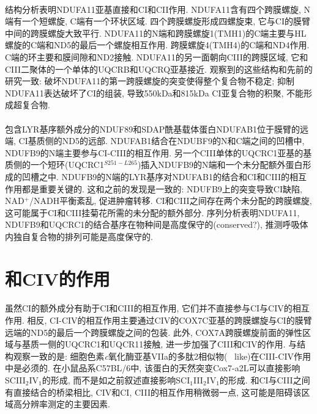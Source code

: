 \documentclass{article}
\begin{document}
  \paragraph{}
    结构分析表明NDUFA11亚基直接和CI和CII作用. NDUFA11含有四个跨膜螺旋, N端有一个短螺旋, C端有一个环状区域. 四个跨膜螺旋形成四螺旋束, 它与CI的膜臂中间的跨膜螺旋大致平行. NDUFA11的N端和跨膜螺旋1(TMH1)的C端主要与HL螺旋的C端和ND5的最后一个螺旋相互作用. 跨膜螺旋4(TMH4)的C端和ND4作用. C端的环主要和膜间隙和ND2接触. NDUFA11的另一面朝向CIII的跨膜区域, 它和CIII二聚体的一个单体的UQCRB和UQCRQ亚基接近. 观察到的这些结构和先前的研究一致: 破坏NDUFA11的第一跨膜螺旋的突变使得整个复合物不稳定; 抑制NDUFA11表达破坏了CI的组装, 导致550kDa和815kDa CI亚复合物的积聚, 不能形成超复合物.
  \paragraph{}
    包含LYR基序额外成分的NDUF89和SDAP酰基载体蛋白NDUFAB1位于膜臂的远端, CI基质侧的ND5的远部. NDUFAB1结合在NDUBF9的N和C端之间的凹槽中, NDUFB9的N端主要参与CI-CIII的相互作用. 另一个CIII单体的UQCRC1亚基的基质侧的一个短环(UQCRC1$^{S251-L265}$)插入NDUFB9的N端和一个未分配额外蛋白形成的凹槽之中. NDUFB9的N端的LYR基序对NDUFAB1的结合和CI和CIII的相互作用都是重要关键的. 这和之前的发现是一致的: NDUFB9上的突变导致CI缺陷, NAD$^+$/NADH平衡紊乱, 促进肿瘤转移. CI和CIII之间存在两个未分配的跨膜螺旋, 这可能属于CI和CIII挂菊花所需的未分配的额外部分. 序列分析表明NDUFA11, NDUFB9和UQCRC1的结合基序在物种间是高度保守的(conserved?), 推测呼吸体内独自复合物的排列可能是高度保守的.

\section{和CIV的作用}
  \paragraph{}
    虽然CI的额外成分有助于CI和CIII的相互作用, 它们并不直接参与CI与CIV的相互作用. 相反, CI-CIV的相互作用主要通过CIV的COX7C亚基的跨膜螺旋与CI的膜臂远端的ND5的最后一个跨膜螺旋之间的包装. 此外, COX7A跨膜螺旋前面的弹性区域与基质一侧的UQCRC1和UQCR11接触, 进一步加强了CIII和CIV的作用. 与结构观察一致的是: 细胞色素\textit{c}氧化酶亚基VIIa的多肽2相似物(~ like)在CIII-CIV作用中是必须的. 在小鼠品系C57BL/6中, 该蛋白的天然突变Cox7-a2L可以直接影响SCIII$_{2}$IV$_{1}$的形成, 而不是如之前叙述直接影响SCI$_{1}$III$_{2}$IV$_{1}$的形成. 和CI与CIII之间有直接结合的桥梁相比, CIV和CI, CIII的相互作用稍微弱一点, 这可能是阻碍该区域高分辨率测定的主要因素.
\end{document}
